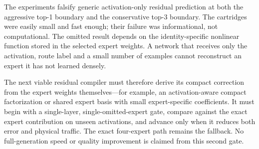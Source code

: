 The experiments falsify generic activation-only residual prediction at both the
aggressive top-1 boundary and the conservative top-3 boundary.  The cartridges
were easily small and fast enough; their failure was informational, not
computational.  The omitted result depends on the identity-specific nonlinear
function stored in the selected expert weights.  A network that receives only
the activation, route label and a small number of examples cannot reconstruct
an expert it has not learned densely.

The next viable residual compiler must therefore derive its compact correction
from the expert weights themselves---for example, an activation-aware compact
factorization or shared expert basis with small expert-specific coefficients.
It must begin with a single-layer, single-omitted-expert gate, compare against
the exact expert contribution on unseen activations, and advance only when it
reduces both error and physical traffic.  The exact four-expert path remains the
fallback.  No full-generation speed or quality improvement is claimed from this
second gate.
